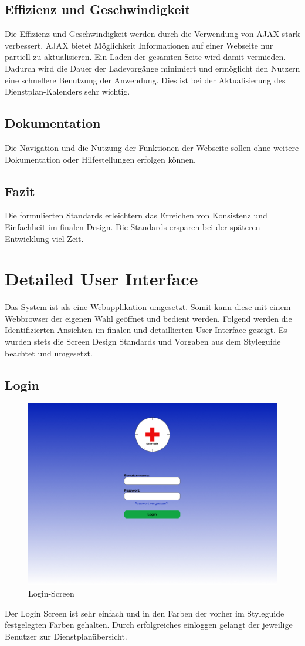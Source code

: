 \documentclass[11pt,
paper=a4,
bibtotocnumbered,	  %
liststotocnumbered,  %
DIV=calc,		  %
tablecaptionabove,	  %
headinclude,
]{article}
\begin{document}
\subsection{Effizienz und Geschwindigkeit}
Die Effizienz und Geschwindigkeit werden durch die Verwendung von AJAX stark verbessert. AJAX bietet Möglichkeit Informationen auf einer Webseite nur partiell zu aktualisieren. Ein Laden der gesamten Seite wird damit vermieden. Dadurch wird die Dauer der Ladevorgänge minimiert und ermöglicht den Nutzern eine schnellere Benutzung der Anwendung. Dies ist bei der Aktualisierung des Dienstplan-Kalenders sehr wichtig.
\subsection{Dokumentation}
Die Navigation und die Nutzung der Funktionen der Webseite sollen ohne weitere Dokumentation oder Hilfestellungen erfolgen können. 
\subsection{Fazit}
Die formulierten Standards erleichtern das Erreichen von Konsistenz und Einfachheit im finalen Design. Die Standards ersparen bei der späteren Entwicklung viel Zeit.
\section{Detailed User Interface}
Das System ist als eine Webapplikation umgesetzt. Somit kann diese mit einem Webbrowser der eigenen Wahl geöffnet und bedient werden. Folgend werden die Identifizierten Ansichten im finalen und detaillierten User Interface gezeigt. Es wurden stets die Screen Design Standards und Vorgaben aus dem Styleguide beachtet und umgesetzt.
\subsection{Login}
\begin{figure}[H]
\includegraphics[width=1\textwidth]{Bilder/Screens/Login-Screen.jpg}{\centering}
\caption{Login-Screen}
\end{figure}
Der Login Screen ist sehr einfach und in den Farben der vorher im Styleguide festgelegten Farben gehalten. Durch erfolgreiches einloggen gelangt der jeweilige Benutzer zur Dienstplanübersicht.
\end{document}
